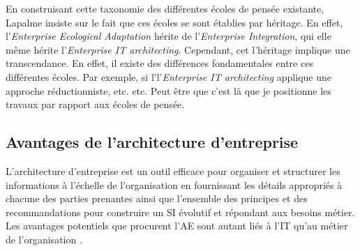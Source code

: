 %
%
%
%

En construisant cette taxonomie des différentes écoles de pensée existante, 
Lapalme insiste sur le fait que ces écoles se sont établies par héritage. En 
effet, l'\textit{Enterprise Ecological Adaptation} hérite de 
l'\textit{Enterprise Integration}, qui elle même hérite l'\textit{Enterprise IT 
architecting}. Cependant, cet l'héritage implique une transcendance. En effet, 
il existe des différences fondamentales entre ces différentes écoles. Par 
exemple, si l'l'\textit{Enterprise IT architecting} applique une approche 
réductionniste, etc. etc.
Peut être que c'est là que je positionne les travaux par rapport aux écoles de pensée.




  
\subsection{Avantages de l'architecture d'entreprise}
L'architecture d'entreprise est un outil efficace pour organiser et structurer les informations à l'échelle de l'organisation en fournissant les détails appropriés à chacune des 
parties prenantes ainsi que l'ensemble des principes et des recommandations pour 
construire un SI évolutif et répondant aux besoins métier. Les avantages 
potentiels que procurent l'AE sont autant liés à l'IT qu'au métier de 
l'organisation \cite{ross2005understanding}.


